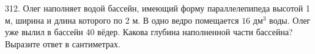 312. Олег наполняет водой бассейн, имеющий форму параллелепипеда высотой 1 м, ширина и длина которого по 2 м. В одно ведро помещается $16\text{ дм}^3$ воды. Олег уже вылил в бассейн 40 вёдер. Какова глубина наполненной части бассейна? Выразите ответ в сантиметрах.\\
